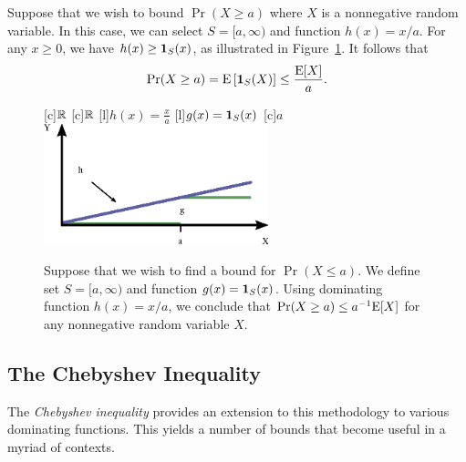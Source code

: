 Suppose that we wish to bound $\Pr (X \geq a)$ where $X$ is a nonnegative random variable.
In this case, we can select $S = [a, \infty)$ and function $h(x) = x/a$.
For any $x \geq 0$, we have $h(x) \geq \mathbf{1}_S(x)$, as illustrated in Figure~\ref{figure:MarkovInequality}.
It follows that
\begin{equation*}
\Pr (X \geq a) = \mathrm{E} \left[ \mathbf{1}_S(X) \right] \leq \frac{\mathrm{E} [X]}{a} .
\end{equation*}

\begin{figure}[thb]
\begin{center}
\begin{psfrags}
[c]{$\mathbb{R}$}
[c]{$\mathbb{R}$}
[l]{$h(x) = \frac{x}{a}$}
[l]{$g(x) = \mathbf{1}_S (x)$}
[c]{$a$}
\includegraphics[width=6.5cm]{Figures/10Chapter/Markov}
\end{psfrags}
\caption{Suppose that we wish to find a bound for $\Pr (X \leq a)$.
We define set $S = [a, \infty)$ and function $g(x) = \mathbf{1}_S (x)$.
Using dominating function $h(x) = x/a$, we conclude that $\Pr(X \geq a) \leq a^{-1} \mathrm{E} [X]$ for any nonnegative random variable $X$.}
\label{figure:MarkovInequality}
\end{center}
\end{figure}


\subsection{The Chebyshev Inequality}

The \emph{Chebyshev inequality} provides an extension to this methodology to various dominating functions. 
This yields a number of bounds that become useful in a myriad of contexts.

